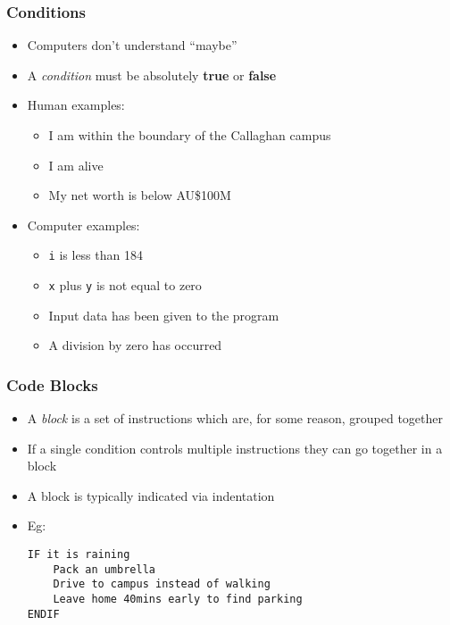\documentclass[14pt]{beamer}
\begin{document}
\begin{frame}
\frametitle{Conditions}
\begin{itemize}
\item Computers don't understand ``maybe''
\item A \textit{condition} must be absolutely \textbf{true} or \textbf{false}
\item Human examples:
	\begin{itemize}
		\item I am within the boundary of the Callaghan campus
		\item I am alive
		\item My net worth is below AU\$100M
	\end{itemize}
\item Computer examples:
	\begin{itemize}
		\item \texttt{i} is less than 184
		\item \texttt{x} plus \texttt{y} is not equal to zero
		\item Input data has been given to the program
		\item A division by zero has occurred
	\end{itemize}
\end{itemize}
\end{frame}

\begin{frame}[fragile]
\frametitle{Code Blocks}
\begin{itemize}
\item A \textit{block} is a set of instructions which are, for some reason, grouped together
\item If a single condition controls multiple instructions they can go together in a block
\item A block is typically indicated via indentation
\item Eg:
\begin{lstlisting}[style=pseudo]
IF it is raining
	Pack an umbrella
	Drive to campus instead of walking
	Leave home 40mins early to find parking
ENDIF
\end{lstlisting}
\end{itemize}
\end{frame}
\end{document}
